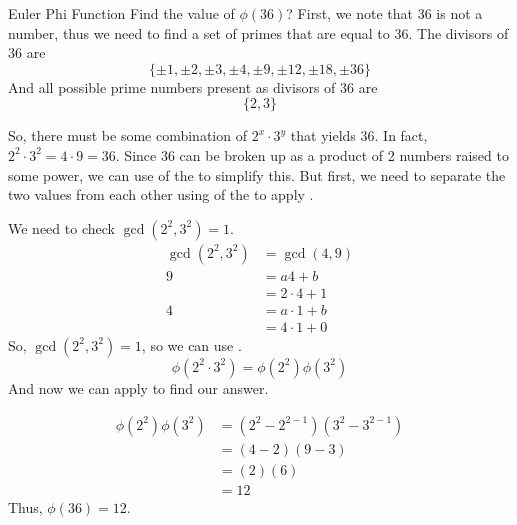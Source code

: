 \begin{example}{Euler Phi Function}
  Find the value of $\phi(36)$?
  \tcblower{}
  First, we note that 36 is not a  number, thus we need to find a set of primes that are equal to 36.
  The divisors of 36 are
  \begin{equation*}
    \lbrace \pm 1, \pm 2, \pm 3, \pm 4, \pm 9, \pm 12, \pm 18, \pm 36 \rbrace
  \end{equation*}
  And all possible prime numbers present as divisors of 36 are
  \begin{equation*}
    \lbrace 2, 3 \rbrace
  \end{equation*}

  So, there must be some combination of $2^{x}\cdot 3^{y}$ that yields 36.
  In fact, $2^{2} \cdot 3^{2} = 4 \cdot 9 = 36$.
  Since 36 can be broken up as a product of 2  numbers raised to some power, we can use  of the  to simplify this.
  But first, we need to separate the two values from each other using  of the  to apply .

  We need to check $\gcd \left( 2^{2}, 3 ^{2} \right) = 1$.
  \begin{align*}
    \gcd \left( 2^{2}, 3^{2} \right) &= \gcd(4, 9) \\
    9 &= a4 + b \\
                                     &= 2 \cdot 4 + 1 \\
    4 &= a \cdot 1 + b \\
                                     &= 4 \cdot 1 + 0
  \end{align*}
  So, $\gcd \left( 2^{2}, 3^{2} \right) = 1$, so we can use .
  \begin{equation*}
    \phi \left( 2^{2} \cdot 3^{2} \right) = \phi \left( 2^{2} \right) \phi \left( 3^{2} \right)
  \end{equation*}
  And now we can apply  to find our answer.

  \begin{align*}
    \phi \left( 2^{2} \right) \phi \left( 3^{2} \right) &= \left( 2^{2} - 2^{2-1} \right) \left( 3^{2} - 3^{2-1} \right) \\
                                                        &= (4-2)(9-3) \\
                                                        &= (2)(6) \\
                                                        &= 12
  \end{align*}
  Thus, $\phi(36) = 12$.
\end{example}

